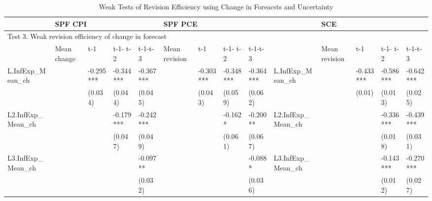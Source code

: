 \documentclass[]{article}
\begin{document}
\begin{table}
	\centering 
	\caption{Weak Tests of Revision Efficiency using Change in Foreacsts and Uncertainty}
	\label{WeakRevEfficiency}
\begin{adjustbox}{width={24cm},totalheight={14cm},angle=90}
	\begin{tabular}{llllllllllllll}
		\hline 
		& \multicolumn{4}{l}{SPF CPI}                     & \multicolumn{4}{l}{SPF PCE}                       &                      & \multicolumn{4}{l}{SCE}                           \\
		\hline 
		\multicolumn{14}{l}{Test 3. Weak revision efficiency of change in forecast}                                                                                                                                    \\
		\hline 
		& Mean change & t-1       & t-1- t-2  & t-1-t-3   & Mean revision & t-1       & t-1- t-2  & t-1-t-3   &                      & Mean revision & t-1       & t-1- t-2  & t-1-t-3   \\
		\hline 
		L.InfExp\_Mean\_ch   &             & -0.295*** & -0.344*** & -0.367*** &               & -0.303*** & -0.348*** & -0.364*** & L.InfExp\_Mean\_ch  &         & -0.433*** & -0.586*** & -0.642*** \\
		&             & (0.034)   & (0.044)   & (0.045)   &               & (0.043)   & (0.059)   & (0.062)   &                    &         & (0.01)     & (0.013)    & (0.025)    \\
	
		L2.InfExp\_Mean\_ch  &             &           & -0.179*** & -0.242*** &               &           & -0.162*   & -0.200**  & L2.InfExp\_Mean\_ch &         &           & -0.336*** & -0.439*** \\
	
		&             &           & (0.047)   & (0.049)   &               &           & (0.061)   & (0.067)   &                                   &         &           & (0.018)    & (0.031)    \\
		L3.InfExp\_Mean\_ch  &             &           &           & -0.097**  &               &           &           & -0.088*   & L3.InfExp\_Mean\_ch &         &           & -0.143*** & -0.270*** \\
		
		&             &           &           & (0.032)   &               &           &           & (0.036)   &                                &         &           & (0.012)    & (0.027)    \\
		

\end{tabular}
\end{adjustbox}
\end{table}
\end{document}
